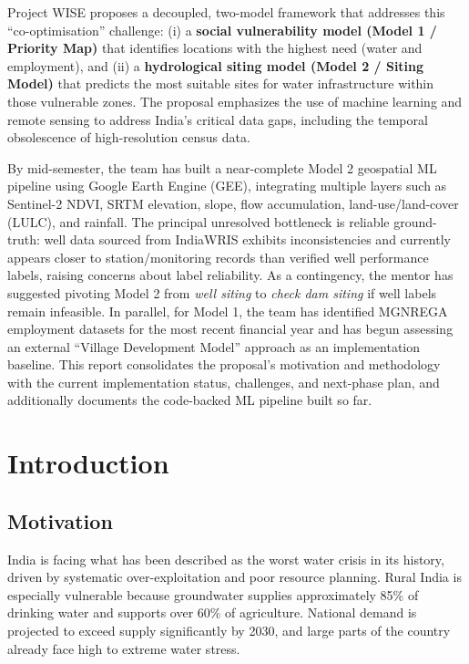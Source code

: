 \documentclass[12pt,a4paper]{report}
\begin{document}
Project WISE proposes a decoupled, two-model framework that addresses this “co-optimisation” challenge: (i) a \textbf{social vulnerability model (Model 1 / Priority Map)} that identifies locations with the highest need (water and employment), and (ii) a \textbf{hydrological siting model (Model 2 / Siting Model)} that predicts the most suitable sites for water infrastructure within those vulnerable zones. The proposal emphasizes the use of machine learning and remote sensing to address India’s critical data gaps, including the temporal obsolescence of high-resolution census data.

By mid-semester, the team has built a near-complete Model 2 geospatial ML pipeline using Google Earth Engine (GEE), integrating multiple layers such as Sentinel-2 NDVI, SRTM elevation, slope, flow accumulation, land-use/land-cover (LULC), and rainfall. The principal unresolved bottleneck is reliable ground-truth: well data sourced from IndiaWRIS exhibits inconsistencies and currently appears closer to station/monitoring records than verified well performance labels, raising concerns about label reliability. As a contingency, the mentor has suggested pivoting Model 2 from \textit{well siting} to \textit{check dam siting} if well labels remain infeasible. In parallel, for Model 1, the team has identified MGNREGA employment datasets for the most recent financial year and has begun assessing an external “Village Development Model” approach as an implementation baseline. This report consolidates the proposal’s motivation and methodology with the current implementation status, challenges, and next-phase plan, and additionally documents the code-backed ML pipeline built so far.

\clearpage
{}

\chapter{Introduction}
\section{Motivation}
India is facing what has been described as the worst water crisis in its history, driven by systematic over-exploitation and poor resource planning. Rural India is especially vulnerable because groundwater supplies approximately 85\% of drinking water and supports over 60\% of agriculture. National demand is projected to exceed supply significantly by 2030, and large parts of the country already face high to extreme water stress.
\end{document}
